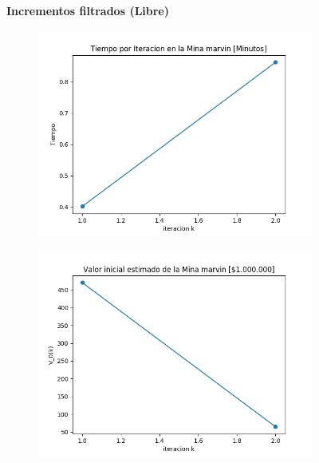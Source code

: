\documentclass[12pt,letterpaper]{article}
\begin{document}
\begin{figure}[H]
  \captionsetup[subfigure]{labelformat=empty}
  \centering
  
   \textbf{Incrementos filtrados (Libre)}
  
  \begin{subfigure}[b]{0.4\textwidth}
     \includegraphics[width=\textwidth]{Graficos/Incrementos_filtrados/libre/marvinml_inc_times.png}
     \caption{}
     \label{asda}
  \end{subfigure}
  \begin{subfigure}[b]{0.4\textwidth}
     \includegraphics[width=\textwidth]{Graficos/Incrementos_filtrados/libre/marvinml_inc_v_k.png}
     \caption{}
     \label{fig:ex2}
  \end{subfigure}
\end{figure}
\end{document}
